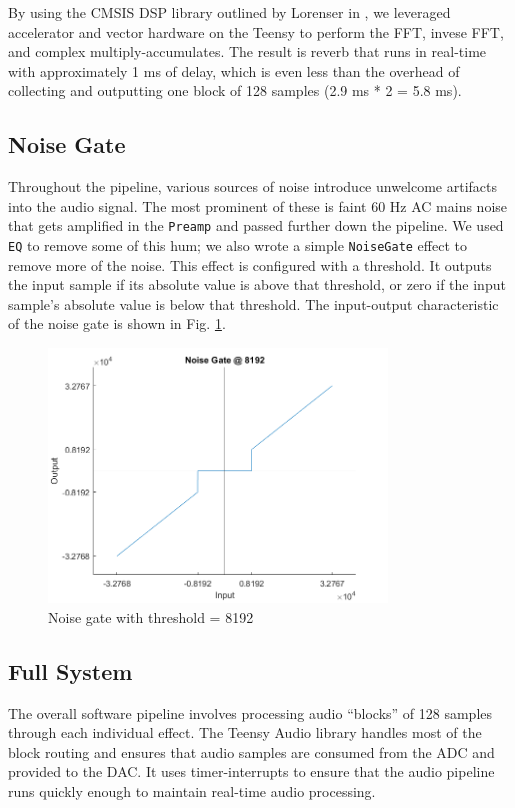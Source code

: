 \documentclass[conference]{IEEEtran}
\begin{document}
By using the CMSIS DSP library outlined by Lorenser in \cite{arm_dsp_cap}, we leveraged accelerator and vector hardware on the Teensy to perform the FFT, invese FFT, and complex multiply-accumulates. The result is reverb that runs in real-time with approximately 1 ms of delay, which is even less than the overhead of collecting and outputting one block of 128 samples (2.9 ms * 2 = 5.8 ms).

\subsection{Noise Gate}

Throughout the pipeline, various sources of noise introduce unwelcome artifacts into the audio signal. The most prominent of these is faint 60 Hz AC mains noise that gets amplified in the \texttt{Preamp} and passed further down the pipeline. We used \texttt{EQ} to remove some of this hum; we also wrote a simple \texttt{NoiseGate} effect to remove more of the noise. This effect is configured with a threshold. It outputs the input sample if its absolute value is above that threshold, or zero if the input sample's absolute value is below that threshold. The input-output characteristic of the noise gate is shown in Fig. \ref{fig:noise_gate}.

\begin{figure}[htbp]
    \centerline{\includegraphics[width=9cm]{noise_gate.png}}
    \caption{Noise gate with threshold = 8192} 
    \label{fig:noise_gate}
\end{figure}

\subsection{Full System}

The overall software pipeline involves processing audio ``blocks'' of 128 samples through each individual effect. The Teensy Audio library \cite{teensy_audio} handles most of the block routing and ensures that audio samples are consumed from the ADC and provided to the DAC. It uses timer-interrupts to ensure that the audio pipeline runs quickly enough to maintain real-time audio processing.
\end{document}
